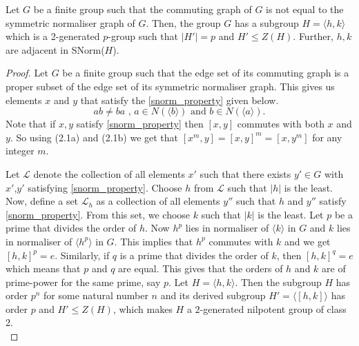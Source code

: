 \begin{lemma}\label{com_eq_snorm_lemma}
    Let $G$ be a finite group such that the commuting graph of $G$ is not equal to the symmetric normaliser graph of $G$. Then, the group $G$ has a subgroup $H = \langle h, k \rangle$ which is a 2-generated $p$-group such that $|H'| = p$ and $H' \leq Z(H)$. Further, $h, k$ are adjacent in SNorm($H$).
\end{lemma}
\begin{proof}
    Let $G$ be a finite group such that the edge set of its commuting graph is a proper subset of the edge set of its symmetric normaliser graph. This gives us elements $x$ and $y$ that satisfy the \ref{snorm_property} given below. 
    \begin{equation}\label{snorm_property}
        ab \neq ba \mbox{ , } a \in N(\langle b \rangle) \mbox{ and }  b \in N(\langle a \rangle).
    \end{equation}
     Note that if $x, y$ satisfy \ref{snorm_property} then $[x, y]$ commutes with both $x$ and $y$. So using (2.1a) and (2.1b) we get that $ [x^m, y]= {[x, y]}^m = [x, y^m]$ for any integer $m$. 
     
     Let $\mathcal{L}$ denote the collection of all elements $x'$ such that there exists $y' \in G$ with $x'$,$y'$ satisfying \ref{snorm_property}. Choose $h$ from $\mathcal{L}$ such that $|h|$ is the least. Now, define a set $\mathcal{L}_h$ as a collection of all elements $y''$ such that $h$ and $y''$ satisfy \ref{snorm_property}. From this set, we choose $k$ such that $|k|$ is the least. Let $p$ be a prime that divides the order of $h$. Now $h^p$ lies in normaliser of $\langle k \rangle$ in $G$ and $k$ lies in normaliser of $\langle h^p \rangle$ in $G$. This implies that $h^p$ commutes with $k$ and we get $[h,k]^p=e$. Similarly, if $q$ is a prime that divides the order of $k$, then $[h,k]^q=e$ which means that $p$ and $q$ are equal. This gives that the orders of $h$ and $k$ are of prime-power for the same prime, say $p$. Let $H=\langle h,k \rangle$. Then the subgroup $H$ has order $p^n$ for some natural number $n$ and its derived subgroup $H' = \langle [h,k] \rangle$ has order $p$ and $H' \leq Z(H)$, which makes $H$ a $2$-generated nilpotent group of class 2. \\
\end{proof}


